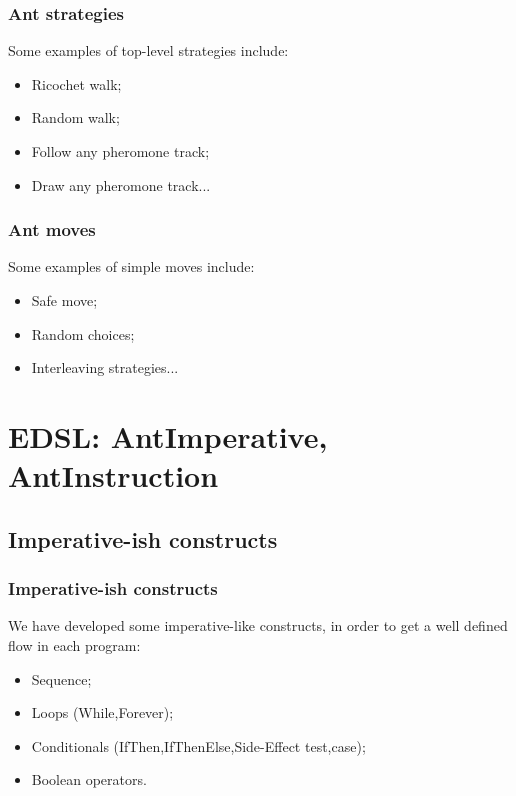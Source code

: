 \documentclass{beamer}
\begin{document}
    \begin{frame}
    \frametitle{Ant strategies} 
            Some examples of top-level strategies include:
            \begin{itemize}
            \item{Ricochet walk;}
            \item{Random walk;}
            \item{Follow any pheromone track;}
            \item{Draw any pheromone track...}
            \end{itemize}
    \end{frame}

    \begin{frame}
    \frametitle{Ant moves}
            Some examples of simple moves include:
            \begin{itemize}
            \item{Safe move;}
            \item{Random choices;}
            \item{Interleaving strategies...}
            \end{itemize}
    \end{frame}   


    \section{EDSL: AntImperative, AntInstruction}

    \subsection{Imperative-ish constructs}
    \begin{frame}
    \frametitle{Imperative-ish constructs}

            We have developed some imperative-like constructs, 
            in order to get a well defined flow in each program:

            \begin{itemize}
            \item Sequence;
            \item Loops (While,Forever);
            \item Conditionals (IfThen,IfThenElse,Side-Effect test,case);
            \item Boolean operators.
            \end{itemize}

    \end{frame}
\end{document}
